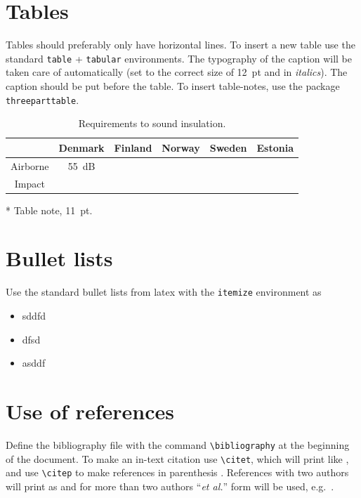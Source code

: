 \documentclass[unicode-math]{interarticle}
\newcommand\comm[1]{\texttt{\textbackslash #1}}
\begin{document}
\section{Tables}
Tables should preferably only have horizontal lines.
To insert a new table use the standard \texttt{table} + \texttt{tabular} environments.
The typography of the caption will be taken care of automatically (set to the correct size of \SI{12}{pt} and in \textit{italics}).
The caption should be put before the table.
To insert table-notes, use the package \texttt{threeparttable}.

\begin{table}[htb]
  \flushleft%
  \small
  \caption{Requirements to sound insulation.}%
  \label{tab:table1}
  \begin{threeparttable}
    \begin{tabular}{cccccc}\toprule
      & Denmark     & Finland & Norway & Sweden & Estonia \\\midrule
      Airborne & \SI{55}{dB}\tnote{*} &         &        &        &         \\
      Impact   &             &         &        &        &         \\\bottomrule
    \end{tabular}
  \begin{tablenotes}
  \item[*] Table note, \SI{11}{pt}.
  \end{tablenotes}
  \end{threeparttable}
\end{table}

\section{Bullet lists}
Use the standard bullet lists from latex with the \texttt{itemize} environment as
\begin{itemize}
  \item sddfd
  \item dfsd
  \item asddf
\end{itemize}

\section{Use of references}
Define the bibliography file with the command \comm{bibliography} at the beginning of the document.
To make an in-text citation use \comm{citet}, which will print like \citet{Isaksson1999}, and use \comm{citep} to make references in parenthesis \citep{Isaksson1999}.
References with two authors will print as \citet{Taylor1991} and for more than two authors ``\emph{et al.}'' form will be used, e.g.\ \citet{Showalter1987}.\par
\end{document}
